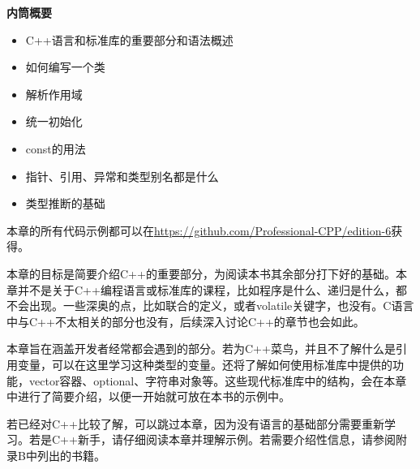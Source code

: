 
\noindent
\textbf{内筒概要}

\begin{itemize}
\item
C++语言和标准库的重要部分和语法概述

\item
如何编写一个类

\item
解析作用域

\item
统一初始化

\item
const的用法

\item
指针、引用、异常和类型别名都是什么

\item
类型推断的基础
\end{itemize}

本章的所有代码示例都可以在\url{https://github.com/Professional-CPP/edition-6}获得。

本章的目标是简要介绍C++的重要部分，为阅读本书其余部分打下好的基础。本章并不是关于C++编程语言或标准库的课程，比如程序是什么、递归是什么，都不会出现。一些深奥的点，比如联合的定义，或者volatile关键字，也没有。C语言中与C++不太相关的部分也没有，后续深入讨论C++的章节也会如此。

本章旨在涵盖开发者经常都会遇到的部分。若为C++菜鸟，并且不了解什么是引用变量，可以在这里学习这种类型的变量。还将了解如何使用标准库中提供的功能，vector容器、optional、字符串对象等。这些现代标准库中的结构，会在本章中进行了简要介绍，以便一开始就可放在本书的示例中。

若已经对C++比较了解，可以跳过本章，因为没有语言的基础部分需要重新学习。若是C++新手，请仔细阅读本章并理解示例。若需要介绍性信息，请参阅附录B中列出的书籍。








